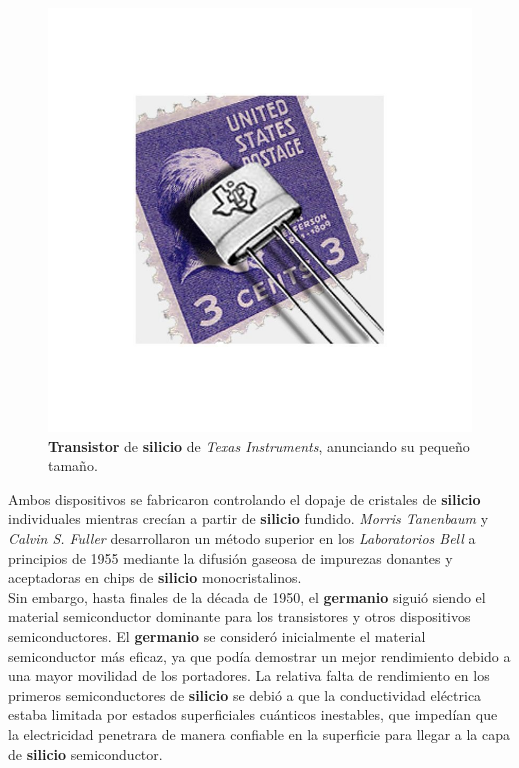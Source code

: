 \begin{figure}[htb]
	\centering
	\includegraphics[scale = 0.2]{Graphics/texas_instruments_silicon_transistor.jpg}
	\caption{\textbf{Transistor} de \textbf{silicio} de \emph{Texas Instruments}, anunciando su pequeño tamaño.}
	\label{fig:5}
\end{figure}

Ambos dispositivos se fabricaron controlando el dopaje de cristales de \textbf{silicio} individuales mientras crecían a partir de \textbf{silicio} fundido. \emph{Morris
Tanenbaum} y \emph{Calvin S. Fuller} desarrollaron un método superior en los \emph {Laboratorios Bell} a principios de 1955 mediante la difusión gaseosa de impurezas
donantes y aceptadoras en chips de \textbf{silicio} monocristalinos.\\
Sin embargo, hasta finales de la década de 1950, el \textbf{germanio} siguió siendo el material semiconductor dominante para los transistores y otros dispositivos
semiconductores. El \textbf{germanio} se consideró inicialmente el material semiconductor más eficaz, ya que podía demostrar un mejor rendimiento debido a una mayor
movilidad de los portadores. La relativa falta de rendimiento en los primeros semiconductores de \textbf{silicio} se debió a que la conductividad eléctrica estaba
limitada por estados superficiales cuánticos inestables, que impedían que la electricidad penetrara de manera confiable en la superficie para llegar a la capa de \textbf
{silicio} semiconductor.\\

